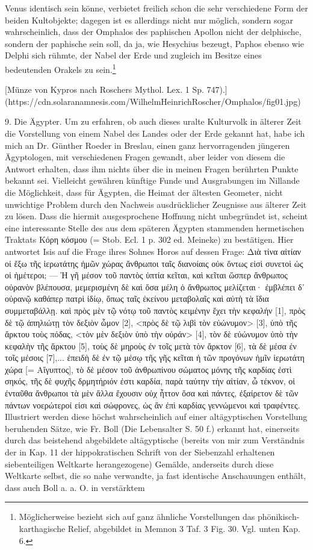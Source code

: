 \documentclass[a4paper, 11pt, oneside]{article}
\begin{document}
Venus identisch sein könne, verbietet freilich schon die sehr verschiedene Form der beiden Kultobjekte; dagegen ist es allerdings nicht nur möglich, sondern sogar wahrscheinlich, dass der Omphalos des paphischen Apollon nicht der delphische, sondern der paphische sein soll, da ja, wie Hesychius bezeugt, Paphos ebenso wie Delphi sich rühmte, der Nabel der Erde und zugleich im Besitze eines bedeutenden Orakels zu sein.\footnote{Möglicherweise bezieht sich auf ganz ähnliche Vorstellungen das phönikisch-karthagische Relief, abgebildet in Memnon 3 Taf. 3 Fig. 30. Vgl. unten Kap. 6.}

[Münze von Kypros nach Roschers Mythol. Lex. 1 Sp. 747).](https://cdn.solaranamnesis.com/WilhelmHeinrichRoscher/Omphalos/fig01.jpg)

9. Die Ägypter. Um zu erfahren, ob auch dieses uralte Kulturvolk in älterer Zeit die Vorstellung von einem Nabel des Landes oder der Erde gekannt hat, habe ich mich an Dr. Günther Roeder in Breslau, einen ganz hervorragenden jüngeren Ägyptologen, mit verschiedenen Fragen gewandt, aber leider von diesem die Antwort erhalten, dass ihm nichts über die in meinen Fragen berührten Punkte bekannt sei. Vielleicht gewähren künftige Funde und Ausgrabungen im Nillande die Möglichkeit, dass für Ägypten, die Heimat der ältesten Geometer, nicht unwichtige Problem durch den Nachweis ausdrücklicher Zeugnisse aus älterer Zeit zu lösen. Dass die hiermit ausgesprochene Hoffnung nicht unbegründet ist, scheint eine interessante Stelle des aus dem späteren Ägypten stammenden hermetischen Traktats Κόρη κόσμου (= Stob. Ecl. 1 p. 302 ed. Meineke) zu bestätigen. Hier antwortet Isis auf die Frage ihres Sohnes Horos auf dessen Frage: Διὰ τίνα αἰτίαν οἱ ἔξω τῆς ἱερωτάτης ἡμῶν χώρας ἄνθρωποι ταῖς διανοίαις οὐκ ὄντως εἰσὶ συνετοὶ ὡς οἱ ἡμέτεροι; --- Ἡ γῆ μέσον τοῦ παντὸς ὑπτία κεῖται, καὶ κεῖται ὥσπερ ἄνθρωπος οὐρανὸν βλέπουσα, μεμερισμένη δὲ καὶ ὅσα μέλη ὁ ἄνθρωπος μελίζεται· ἐμβλέπει δ᾽ οὐρανῷ καθάπερ πατρὶ ἰδίῳ, ὅπως ταῖς ἐκείνου μεταβολαῖς καὶ αὐτὴ τὰ ἴδια συμμεταβάλλῃ. καὶ πρὸς μὲν τῷ νότῳ τοῦ παντὸς κειμένην ἔχει τὴν κεφαλήν [1], πρὸς δὲ τῷ ἀπηλιώτῃ τὸν δεξιὸν ὦμον [2], <πρὸς δὲ τῷ λιβὶ τὸν εὐώνυμον> [3], ὑπὸ τῆς ἄρκτου τοὺς πόδας, <τὸν μὲν δεξιὸν ὑπὸ τὴν οὐράν> [4], τὸν δὲ εὐώνυμον ὑπὸ τὴν κεφαλὴν τῆς ἄρκτου [5], τοὺς δὲ μηροὺς ἐν τοῖς μετὰ τὸν ἄρκτον [6], τὰ δὲ μέσα ἐν τοῖς μέσοις [7],... ἐπειδὴ δὲ ἐν τῷ μέσῳ τῆς γῆς κεῖται ἡ τῶν προγόνων ἡμῖν ἱερωτάτη χώρα [= Αἴγυπτος], τὸ δὲ μέσον τοῦ ἀνθρωπίνου σώματος μόνης τῆς καρδίας ἐστὶ σηκός, τῆς δὲ φυχῆς δρμητήριόν ἐστι καρδία, παρὰ ταύτην τὴν αἰτίαν, ὦ τέκνον, οἱ ἐνταῦθα ἄνθρωποι τὰ μὲν ἄλλα ἔχουσιν οὐχ ἧττον ὅσα καὶ πάντες, ἐξαίρετον δὲ τῶν πάντων νοερώτεροί εἰσι καὶ σώφρονες, ὡς ἂν ἐπὶ καρδίας γεννώμενοι καὶ τραφέντες. Illustriert werden diese höchst wahrscheinlich auf einer altägyptischen Vorstellung beruhenden Sätze, wie Fr. Boll (Die Lebensalter S. 50 f.) erkannt hat, einerseits durch das beistehend abgebildete altägyptische (bereits von mir zum Verständnis der in Kap. 11 der hippokratischen Schrift von der Siebenzahl erhaltenen siebenteiligen Weltkarte herangezogene) Gemälde, anderseits durch diese Weltkarte selbst, die so nahe verwandte, ja fast identische Anschauungen enthält, dass auch Boll a. a. O. in verstärktem 
\end{document}
